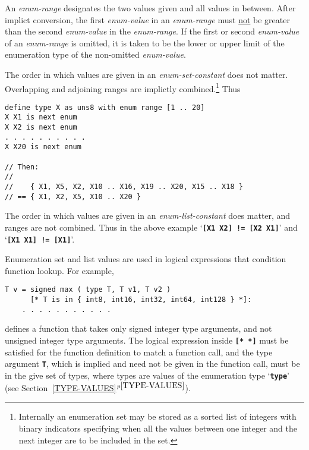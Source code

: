 \documentclass[12pt]{article}
\newcommand{\TT}[1]{{\tt \bfseries #1}}
\newcommand{\itemref}[1]{\ref{#1}$^{p\pageref{#1}}$}
\newenvironment{indpar}[1][0.3in]%
	{\begin{list}{}%
		     {\setlength{\itemsep}{0in}%
		      \setlength{\topsep}{0in}%
		      \setlength{\parsep}{1ex}%
		      \setlength{\labelwidth}{#1}%
		      \setlength{\leftmargin}{#1}%
		      \addtolength{\leftmargin}{\labelsep}}%
	 \item}%
	{\end{list}}
\begin{document}
An {\em enum-range} designates the two values given and all
values in between.
After implict conversion, the first {\em enum-value} in an {\em enum-range}
must \underline{not} be greater than the second {\em enum-value}
in the {\em enum-range}.  If the first or second {\em enum-value} of
an {\em enum-range} is omitted, it is taken to be the lower or upper
limit of the enumeration type of the non-omitted {\em enum-value}.

The order in which values are given in an {\em enum-set-constant}
does not matter.  Overlapping and adjoining ranges are implictly
combined.\footnote{Internally an enumeration set may be stored as a
sorted list of integers with binary indicators specifying when all
the values between one integer and the next integer are to be included
in the set.}
Thus
\begin{indpar}\begin{verbatim}
define type X as uns8 with enum range [1 .. 20]
X X1 is next enum
X X2 is next enum
. . . . . . . . . .
X X20 is next enum

// Then:
//
//    { X1, X5, X2, X10 .. X16, X19 .. X20, X15 .. X18 }
// == { X1, X2, X5, X10 .. X20 }
\end{verbatim}\end{indpar}

The order in which values are given in an {\em enum-list-constant}
does matter, and ranges are not combined.  Thus in the above
example `\TT{[X1 X2] != [X2 X1]}' and `\TT{[X1 X1] != [X1]}'.

Enumeration set and list values are used in logical expressions that
condition function lookup.  For example,
\begin{indpar}\begin{verbatim}
T v = signed max ( type T, T v1, T v2 )
      [* T is in { int8, int16, int32, int64, int128 } *]:
    . . . . . . . . . . .
\end{verbatim}\end{indpar}

defines a function that takes only signed integer type
arguments, and not unsigned integer type arguments.
The logical expression inside \TT{[*~*]} must be satisfied
for the function definition to match a function call, and
the type argument \TT{T}, which is implied and need not be
given in the function call, must be in the give set of
types, where types are values of the enumeration type `\TT{type}'
(see Section~\itemref{TYPE-VALUES}).
\end{document}
